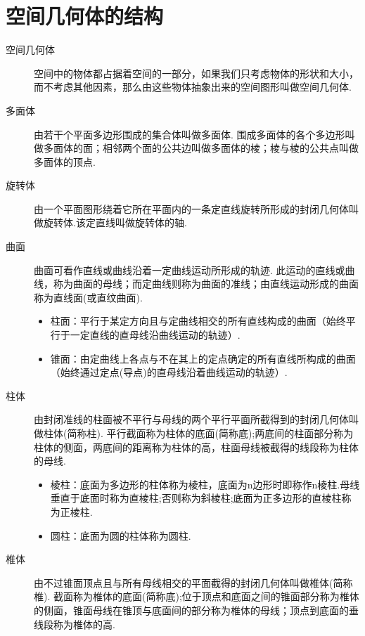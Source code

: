 \section{空间几何体的结构}
  \begin{description}
    \item[空间几何体] 空间中的物体都占据着空间的一部分，如果我们只考虑物体的形状和大小，而不考虑其他因素，那么由这些物体抽象出来的空间图形叫做空间几何体.
    \item[多面体] 由若干个平面多边形围成的集合体叫做多面体.
      围成多面体的各个多边形叫做多面体的面；相邻两个面的公共边叫做多面体的棱；棱与棱的公共点叫做多面体的顶点.
    \item[旋转体] 由一个平面图形绕着它所在平面内的一条定直线旋转所形成的封闭几何体叫做旋转体.该定直线叫做旋转体的轴.
    \item[曲面] 曲面可看作直线或曲线沿着一定曲线运动所形成的轨迹.
      此运动的直线或曲线，称为曲面的母线；而定曲线则称为曲面的准线；由直线运动形成的曲面称为直线面(或直纹曲面).
      \begin{itemize}[leftmargin=*]
        \kaishu
        \item 柱面：平行于某定方向且与定曲线相交的所有直线构成的曲面（始终平行于一定直线的直母线沿曲线运动的轨迹）.
        \item 锥面：由定曲线上各点与不在其上的定点确定的所有直线所构成的曲面（始终通过定点(导点)的直母线沿着曲线运动的轨迹）.
      \end{itemize}
    \item[柱体] 由封闭准线的柱面被不平行与母线的两个平行平面所截得到的封闭几何体叫做柱体(简称柱).
      平行截面称为柱体的底面(简称底);两底间的柱面部分称为柱体的侧面，两底间的距离称为柱体的高，柱面母线被截得的线段称为柱体的母线.
      \begin{itemize}[leftmargin=*]
        \kaishu
        \item 棱柱：底面为多边形的柱体称为棱柱，底面为n边形时即称作n棱柱.母线垂直于底面时称为直棱柱;否则称为斜棱柱;底面为正多边形的直棱柱称为正棱柱.
        \item 圆柱：底面为圆的柱体称为圆柱.
      \end{itemize}
    \item[椎体] 由不过锥面顶点且与所有母线相交的平面截得的封闭几何体叫做椎体(简称椎).
      截面称为椎体的底面(简称底);位于顶点和底面之间的锥面部分称为椎体的侧面，锥面母线在锥顶与底面间的部分称为椎体的母线；顶点到底面的垂线段称为椎体的高.

\end{description}
